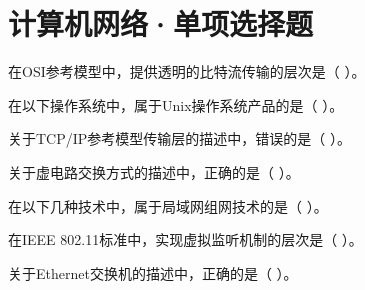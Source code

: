 \section{计算机网络·单项选择题}
\begin{qitems}[startnum=41]

\begin{bbox}
\qitem 在OSI参考模型中，提供透明的比特流传输的层次是（ ）。\par
{}
\end{bbox}

\begin{bbox}
\qitem 在以下操作系统中，属于Unix操作系统产品的是（ ）。\par
{}
\end{bbox}

\begin{bbox}
\qitem 关于TCP/IP参考模型传输层的描述中，错误的是（ ）。\par
{}
\end{bbox}

\begin{bbox}
\qitem 关于虚电路交换方式的描述中，正确的是（ ）。\par
{}
\end{bbox}

\begin{bbox}
\qitem 在以下几种技术中，属于局域网组网技术的是（ ）。\par
{}
\end{bbox}

\begin{bbox}
\qitem 在IEEE 802.11标准中，实现虚拟监听机制的层次是（ ）。\par
{}
\end{bbox}

\begin{bbox}
\qitem 关于Ethernet交换机的描述中，正确的是（ ）。\par
{}
\end{bbox}


\end{qitems}
